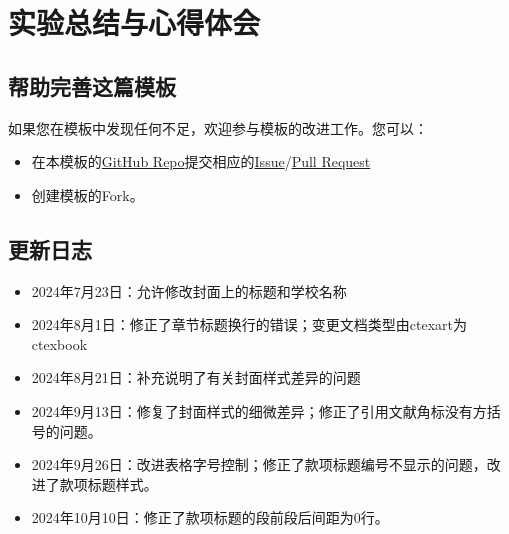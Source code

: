 \chapter{实验总结与心得体会}

\section{帮助完善这篇模板}\label{sec:joinus}

如果您在模板中发现任何不足，欢迎参与模板的改进工作。您可以：

\begin{itemize}
    \item 在本模板的\href{https://github.com/GitHubonline1396529/dlmuucexpreport}{GitHub Repo}提交相应的\href{https://github.com/GitHubonline1396529/dlmuucexpreport/issues}{Issue}/\href{https://github.com/GitHubonline1396529/dlmuucexpreport/pulls}{Pull Request}
    \item 创建模板的Fork。
\end{itemize}

\section{更新日志}

\begin{itemize}
    \item 2024年7月23日：允许修改封面上的标题和学校名称
    \item 2024年8月1日：修正了章节标题换行的错误；变更文档类型由ctexart为ctexbook
    \item 2024年8月21日：补充说明了有关封面样式差异的问题
    \item 2024年9月13日：修复了封面样式的细微差异；修正了引用文献角标没有方括号的问题。
    \item 2024年9月26日：改进表格字号控制；修正了款项标题编号不显示的问题，改进了款项标题样式。
    \item 2024年10月10日：修正了款项标题的段前段后间距为0行。
\end{itemize}